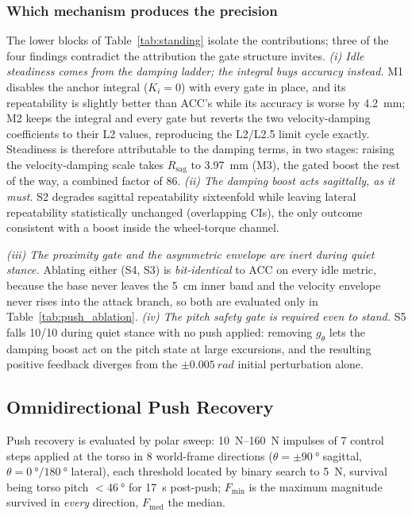 \documentclass{jcd}
\begin{document}
\subsubsection{Which mechanism produces the precision}
\label{sec:idle_mechanism}

The lower blocks of Table~\ref{tab:standing} isolate the contributions; three of
the four findings contradict the attribution the gate structure invites.
\emph{(i) Idle steadiness comes from the damping ladder; the integral buys
accuracy instead.} M1 disables the anchor integral ($K_i{=}0$) with every gate in
place, and its repeatability is slightly better than ACC's while its accuracy is
worse by \SI{4.2}{mm}; M2 keeps the integral and every gate but reverts the two
velocity-damping coefficients to their L2 values, reproducing the L2/L2.5 limit
cycle exactly. Steadiness is therefore attributable to the damping terms, in two
stages: raising the velocity-damping scale takes $R_{\text{sag}}$ to
\SI{3.97}{mm} (M3), the gated boost the rest of the way, a combined factor of \num{86}. \emph{(ii) The damping boost acts sagittally, as it must.} S2 degrades
sagittal repeatability sixteenfold while leaving lateral repeatability
statistically unchanged (overlapping CIs), the only outcome consistent with a
boost inside the wheel-torque channel.

\emph{(iii) The proximity gate and the asymmetric envelope are inert during
quiet stance.} Ablating either (S4, S3) is \emph{bit-identical} to ACC on every idle metric, because the base never leaves the \SI{5}{cm} inner band and the velocity
envelope never rises into the attack branch, so both are evaluated only in
Table~\ref{tab:push_ablation}. \emph{(iv) The pitch safety gate is required even
to stand.} S5 falls \num{10}/\num{10} during quiet stance with no push applied:
removing $g_\theta$ lets the damping boost act on the pitch state at large
excursions, and the resulting positive feedback diverges from the
${\pm}\SI{0.005}{rad}$ initial perturbation alone.

\subsection{Omnidirectional Push Recovery}
\label{sec:push}

Push recovery is evaluated by polar sweep: \SIrange{10}{160}{N} impulses of
\num{7} control steps applied at the torso in \num{8} world-frame directions
($\theta{=}\pm\SI{90}{\degree}$ sagittal,
$\theta{=}\SI{0}{\degree}/\SI{180}{\degree}$ lateral), each threshold located by
binary search to \SI{5}{N}, survival being torso pitch $<\SI{46}{\degree}$ for
\SI{17}{s} post-push; $F_{\min}$ is the maximum magnitude survived in
\emph{every} direction, $F_{\text{med}}$ the median.
\end{document}
